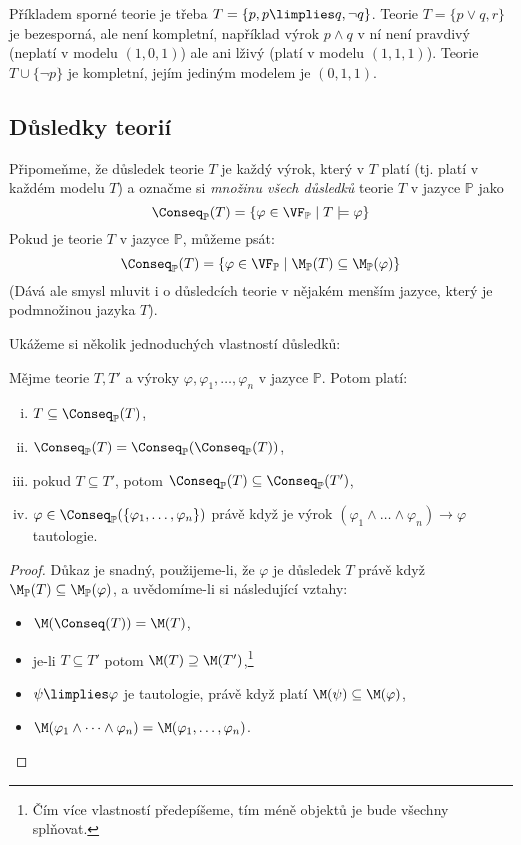 \begin{example} 
    Příkladem sporné teorie je třeba $T=\{p,p\limplies q,\neg q\}$. Teorie $T=\{p\lor q,r\}$ je bezesporná, ale není kompletní, například výrok $p\land q$ v ní není pravdivý (neplatí v modelu $(1,0,1)$) ale ani lživý (platí v modelu $(1,1,1)$). Teorie $T\cup\{\neg p\}$ je kompletní, jejím jediným modelem je $(0,1,1)$.
\end{example}

\subsection{Důsledky teorií}

Připomeňme, že důsledek teorie $T$ je každý výrok, který v $T$ platí (tj. platí v každém modelu $T$) a označme si \emph{množinu všech důsledků} teorie $T$ v jazyce $\mathbb P$ jako
$$
\Conseq_\mathbb P(T)=\{\varphi\in\VF_\mathbb P\mid T\models \varphi\}
$$
Pokud je teorie $T$ v jazyce $\mathbb P$, můžeme psát: 
$$
\Conseq_\mathbb P(T)=\{\varphi\in\VF_\mathbb P\mid \M_\mathbb P(T)\subseteq \M_\mathbb P(\varphi)\}
$$
(Dává ale smysl mluvit i o důsledcích teorie v nějakém menším jazyce, který je podmnožinou jazyka $T$). 

Ukážeme si několik jednoduchých vlastností důsledků:
\begin{proposition}\label{proposition:properties-of-consequences}
    Mějme teorie $T,T'$ a výroky $\varphi,\varphi_1,\dots,\varphi_n$ v jazyce $\mathbb P$. Potom platí:
    \begin{enumerate}[(i)]       
        \item $T\subseteq\Conseq_\mathbb P(T)$,
        \item $\Conseq_\mathbb P(T)=\Conseq_\mathbb P(\Conseq_\mathbb P(T))$,
        \item pokud $T\subseteq T'$, potom $\Conseq_\mathbb P(T)\subseteq\Conseq_\mathbb P(T')$,
        \item $\varphi\in\Conseq_\mathbb P(\{\varphi_1,\dots,\varphi_n\})$ právě když je výrok $(\varphi_1\land \dots\land\varphi_n)\to\varphi$ tautologie.
    \end{enumerate}
\end{proposition}

\begin{proof}
    Důkaz je snadný, použijeme-li, že $\varphi$ je důsledek $T$ právě když $\M_\mathbb P(T)\subseteq \M_\mathbb P(\varphi)$, a uvědomíme-li si následující vztahy:
    \begin{itemize}
        \item $\M(\Conseq(T))=\M(T)$,
        \item je-li $T\subseteq T'$ potom $\M(T)\supseteq\M(T')$,\footnote{Čím více vlastností předepíšeme, tím méně objektů je bude všechny splňovat.}
        \item $\psi\limplies\varphi$ je tautologie, právě když platí $\M(\psi)\subseteq\M(\varphi)$,
        \item $\M(\varphi_1\land \dots\land\varphi_n)=\M(\varphi_1,\dots,\varphi_n)$.
    \end{itemize}
\end{proof}

